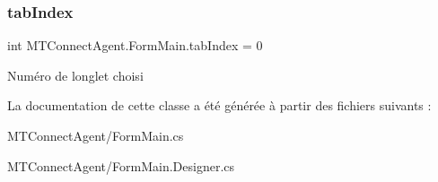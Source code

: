 \subsubsection{\texorpdfstring{tab\+Index}{tabIndex}}
{\footnotesize\ttfamily int M\+T\+Connect\+Agent.\+Form\+Main.\+tab\+Index = 0\hspace{0.3cm}{\ttfamily [private]}}



Numéro de l\textquotesingle{}onglet choisi 



La documentation de cette classe a été générée à partir des fichiers suivants \+:\begin{DoxyCompactItemize}
\item 
M\+T\+Connect\+Agent/Form\+Main.\+cs\item 
M\+T\+Connect\+Agent/Form\+Main.\+Designer.\+cs\end{DoxyCompactItemize}
